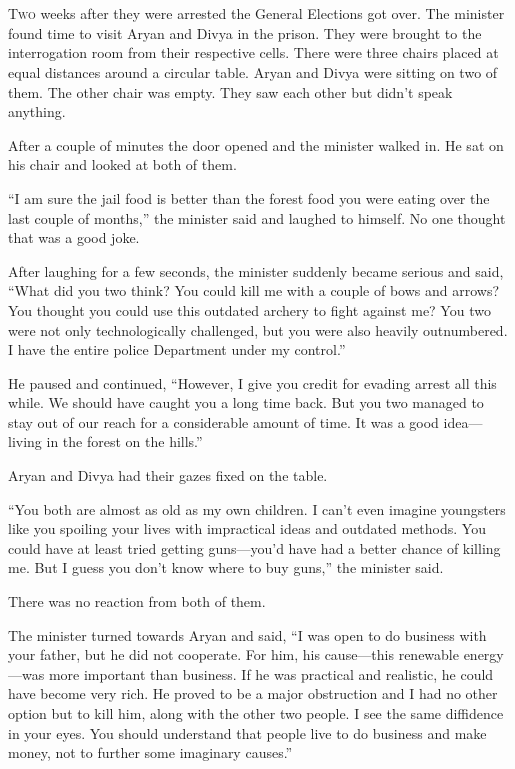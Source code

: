 \chapter{}

\lettrine{T}{wo} weeks after they were arrested the General Elections got over. The minister
found time to visit Aryan and Divya in the prison. They were brought to the
interrogation room from their respective cells. There were three chairs placed
at equal distances around a circular table. Aryan and Divya were sitting on two
of them. The other chair was empty. They saw each other but didn't speak
anything.

After a couple of minutes the door opened and the minister walked in. He sat on
his chair and looked at both of them.

“I am sure the jail food is better than the forest food you were eating over the
last couple of months,” the minister said and laughed to himself. No one thought
that was a good joke.

After laughing for a few seconds, the minister suddenly became serious and said,
“What did you two think? You could kill me with a couple of bows and arrows? You
thought you could use this outdated archery to fight against me? You two were
not only technologically challenged, but you were also heavily outnumbered. I
have the entire police Department under my control.”

He paused and continued, “However, I give you credit for evading arrest all this
while. We should have caught you a long time back. But you two managed to stay
out of our reach for a considerable amount of time. It was a good idea—living
in the forest on the hills.”

Aryan and Divya had their gazes fixed on the table.

“You both are almost as old as my own children. I can't even imagine youngsters
like you spoiling your lives with impractical ideas and outdated methods. You
could have at least tried getting guns—you'd have had a better chance of
killing me. But I guess you don't know where to buy guns,” the minister said.

There was no reaction from both of them.

The minister turned towards Aryan and said, “I was open to do business with your
father, but he did not cooperate. For him, his cause—this renewable energy—was
more important than business. If he was practical and realistic, he could
have become very rich. He proved to be a major obstruction and I had no other
option but to kill him, along with the other two people. I see the same
diffidence in your eyes. You should understand that people live to do business
and make money, not to further some imaginary causes.”

